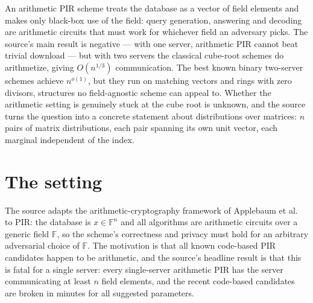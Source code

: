 \documentclass{aicr-conjecture}
\newcommand{\F}{\mathbb{F}}
\begin{document}

\vspace{0.4em}

\begin{informalconjecture}
An arithmetic PIR scheme treats the database as a vector of field
elements and makes only black-box use of the field: query generation,
answering and decoding are arithmetic circuits that must work for
whichever field an adversary picks. The source's main result is negative
--- with one server, arithmetic PIR cannot beat trivial download --- but
with two servers the classical cube-root schemes do arithmetize, giving
$O(n^{1/3})$ communication. The best known binary two-server schemes
achieve $n^{o(1)}$, but they run on matching vectors and rings with zero
divisors, structures no field-agnostic scheme can appeal to. Whether the
arithmetic setting is genuinely stuck at the cube root is unknown, and
the source turns the question into a concrete statement about
distributions over matrices: $n$ pairs of matrix distributions, each pair
spanning its own unit vector, each marginal independent of the index.
\end{informalconjecture}

\section{The setting}\label{sec:setting}

The source adapts the arithmetic-cryptography framework of
Applebaum et al.~\cite{ABDIN24} to PIR: the database is $x \in \F^{n}$
and all algorithms are arithmetic circuits over a generic field $\F$, so
the scheme's correctness and privacy must hold for an arbitrary
adversarial choice of $\F$. The motivation is that all known code-based
PIR candidates happen to be arithmetic, and the source's headline result
is that this is fatal for a single server: every single-server arithmetic
PIR has the server communicating at least $n$ field elements, and the
recent code-based candidates are broken in minutes for all suggested
parameters.
\end{document}
